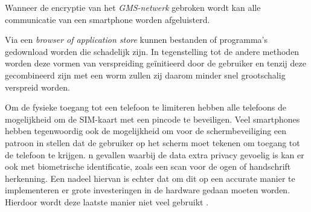 Wanneer de encryptie van het \emph{GMS-netwerk} gebroken wordt kan alle communicatie van een smartphone worden afgeluisterd. 

Via een \emph{browser of application store} kunnen bestanden of programma's gedownload worden die schadelijk zijn. In tegenstelling tot de andere methoden worden deze vormen van verspreiding ge\"initieerd door de gebruiker en tenzij deze gecombineerd zijn met een worm zullen zij daarom minder snel grootschalig verspreid worden. 	

Om de fysieke toegang tot een telefoon te limiteren hebben alle telefoons de mogelijkheid om de SIM-kaart met een pincode te beveiligen. Veel smartphones hebben tegenwoordig ook de mogelijkheid om voor de schermbeveiliging een patroon in stellen dat de gebruiker op het scherm moet tekenen om toegang tot de telefoon te krijgen. n gevallen waarbij de data extra privacy gevoelig is kan er ook met biometrische identificatie, zoals een scan voor de ogen of handschrift herkenning. Een nadeel hiervan is echter dat om dit op een accurate manier te implementeren er grote investeringen in de hardware gedaan moeten worden. Hierdoor wordt deze laatste manier niet veel gebruikt \citep{thirumathyam2010}.  


